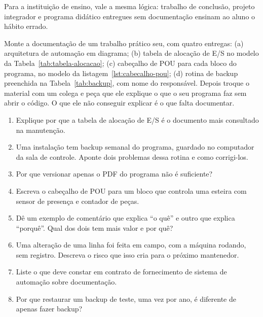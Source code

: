 Para a instituição de ensino, vale a mesma lógica: trabalho de conclusão, projeto integrador e
programa didático entregues sem documentação ensinam ao aluno o hábito errado.

\begin{pratica}
Monte a documentação de um trabalho prático seu, com quatro entregas:
(a) arquitetura de automação em diagrama;
(b) tabela de alocação de E/S no modelo da Tabela~\ref{tab:tabela-alocacao};
(c) cabeçalho de POU para cada bloco do programa, no modelo da
listagem~\ref{lst:cabecalho-pou};
(d) rotina de backup preenchida na Tabela~\ref{tab:backup}, com nome do responsável.
Depois troque o material com um colega e peça que ele explique o que o seu programa faz sem abrir o
código. O que ele não conseguir explicar é o que falta documentar.
\end{pratica}

\begin{exercicios}
\begin{enumerate}[label=\alph*)]
  \item Explique por que a tabela de alocação de E/S é o documento mais consultado na manutenção.
  \item Uma instalação tem backup semanal do programa, guardado no computador da sala de controle.
        Aponte dois problemas dessa rotina e como corrigi-los.
  \item Por que versionar apenas o PDF do programa não é suficiente?
  \item Escreva o cabeçalho de POU para um bloco que controla uma esteira com sensor de presença e
        contador de peças.
  \item Dê um exemplo de comentário que explica ``o quê'' e outro que explica ``porquê''. Qual dos
        dois tem mais valor e por quê?
  \item Uma alteração de uma linha foi feita em campo, com a máquina rodando, sem registro. Descreva
        o risco que isso cria para o próximo mantenedor.
  \item Liste o que deve constar em contrato de fornecimento de sistema de automação sobre
        documentação.
  \item Por que restaurar um backup de teste, uma vez por ano, é diferente de apenas fazer backup?
\end{enumerate}
\end{exercicios}
